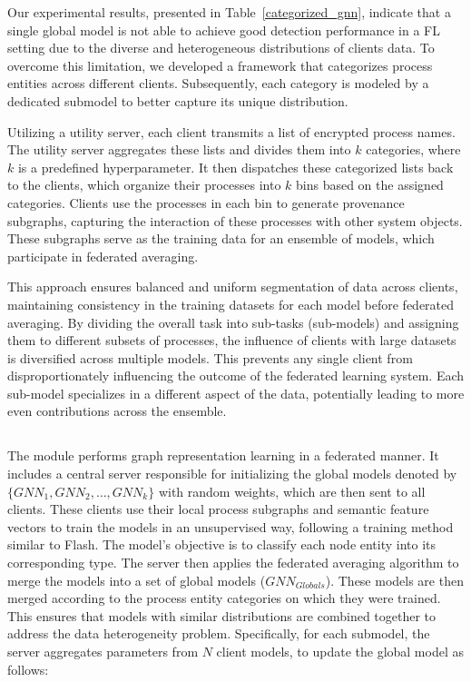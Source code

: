 Our experimental results, presented in Table~\ref{categorized_gnn}, indicate that a single global \gnnshort model is not able to achieve good detection performance in a FL setting due to the diverse and heterogeneous distributions of clients data. To overcome this limitation, we developed a framework that categorizes process entities across different clients. Subsequently, each category is modeled by a dedicated submodel to better capture its unique distribution.

Utilizing a utility server, each client transmits a list of encrypted process names. The utility server aggregates these lists and divides them into \(k\) categories, where \(k\) is a predefined hyperparameter. It then dispatches these categorized lists back to the clients, which organize their processes into \(k\) bins based on the assigned categories. Clients use the processes in each bin to generate provenance subgraphs, capturing the interaction of these processes with other system objects. These subgraphs serve as the training data for an ensemble of \gnnshort models, which participate in federated averaging.

This approach ensures balanced and uniform segmentation of data across clients, maintaining consistency in the training datasets for each \gnnshort model before federated averaging. By dividing the overall task into sub-tasks (sub-models) and assigning them to different subsets of processes, the influence of clients with large datasets is diversified across multiple models. This prevents any single client from disproportionately influencing the outcome of the federated learning system. Each sub-model specializes in a different aspect of the data, potentially leading to more even contributions across the ensemble.

\subsection{\fpgl}
\label{sys:fpgl}


The module performs graph representation learning in a federated manner. It includes a central server responsible for initializing the global \gnnshort models denoted by \(\{GNN_1, GNN_2, \ldots, GNN_k\} \) with random weights, which are then sent to all clients. These clients use their local process subgraphs and semantic feature vectors to train the \gnnshort models in an unsupervised way, following a training method similar to Flash. The \gnnshort model's objective is to classify each node entity into its corresponding type. The server then applies the federated averaging algorithm to merge the \gnnshort models into a set of global models (\( GNN_{Globals} \)). These models are then merged according to the process entity categories on which they were trained. This ensures that models with similar distributions are combined together to address the data heterogeneity problem. Specifically, for each submodel, the server aggregates parameters from \(N\) client models, to update the global model as follows:

